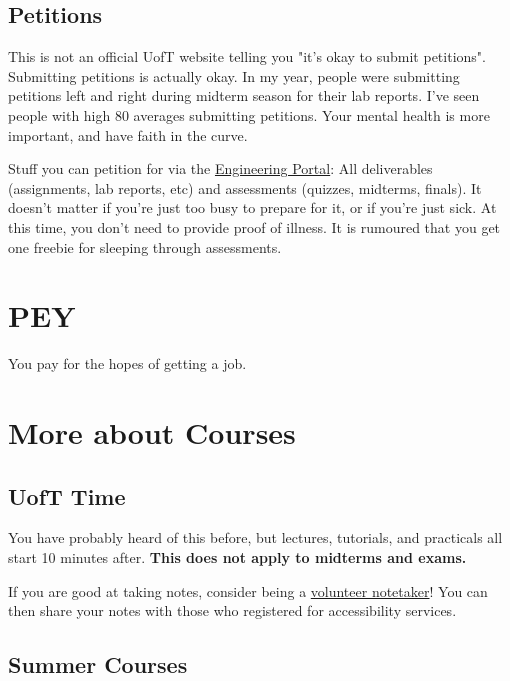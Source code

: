 \subsection{Petitions}

This is not an official UofT website telling you "it's okay to submit petitions". Submitting petitions is actually okay. In my year, people were submitting petitions left and right during midterm season for their lab reports. I've seen people with high 80 averages submitting petitions. Your mental health is more important, and have faith in the curve.

Stuff you can petition for via the \href{https://www.google.com/url?sa=t&rct=j&q=&esrc=s&source=web&cd=&cad=rja&uact=8&ved=2ahUKEwjZj-qeh-7-AhX-kokEHX8-C8YQFnoECA0QAQ&url=http\%3A\%2F\%2Fundergrad.engineering.utoronto.ca\%2Fskule-\%2520\%2520\%2520\%2520\%2520\%2520\%2520\%2520\%2520\%2520\%2520\%2520life\%2Fthe-engineering-portal\%2F&usg=AOvVaw145xL8tAHUKBRq6D6rbDhS}{Engineering Portal}: All deliverables (assignments, lab reports, etc) and assessments (quizzes, midterms, finals). It doesn't matter if you're just too busy to prepare for it, or if you're just sick. At this time, you don't need to provide proof of illness. It is rumoured that you get one freebie for sleeping through assessments.

\section{PEY}

You pay for the hopes of getting a job.

\section{More about Courses}

\subsection{UofT Time}

You have probably heard of this before, but lectures, tutorials, and practicals all start 10 minutes after. \textbf{This does not apply to midterms and exams.}


If you are good at taking notes, consider being a \href{https://studentlife.utoronto.ca/program/volunteer-note-taking/}{volunteer notetaker}! You can then share your notes with those who registered for accessibility services.

\subsection{Summer Courses}

